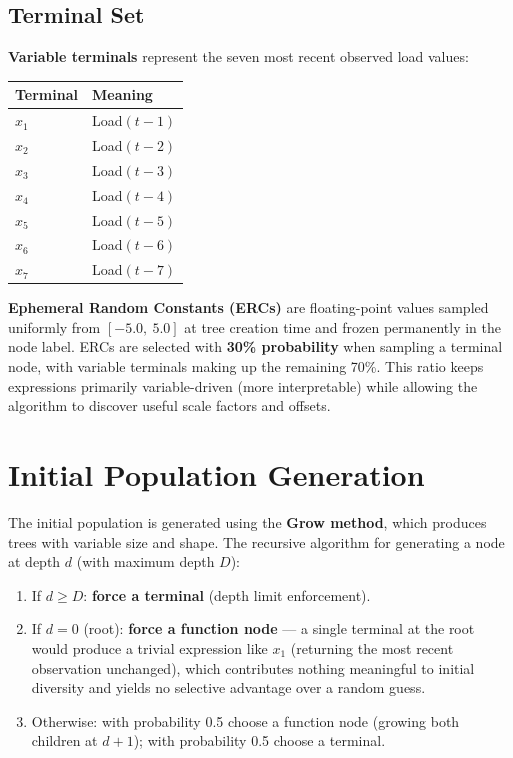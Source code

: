 \documentclass[12pt,a4paper]{article}
\begin{document}
\subsection{Terminal Set}

\textbf{Variable terminals} represent the seven most recent observed load values:

\begin{center}
\begin{tabular}{ll}
\toprule
\textbf{Terminal} & \textbf{Meaning} \\
\midrule
$x_1$ & Load$(t-1)$ \\
$x_2$ & Load$(t-2)$ \\
$x_3$ & Load$(t-3)$ \\
$x_4$ & Load$(t-4)$ \\
$x_5$ & Load$(t-5)$ \\
$x_6$ & Load$(t-6)$ \\
$x_7$ & Load$(t-7)$ \\
\bottomrule
\end{tabular}
\end{center}

\textbf{Ephemeral Random Constants (ERCs)} are floating-point values sampled uniformly from $[-5.0,\ 5.0]$ at tree creation time and frozen permanently in the node label. ERCs are selected with \textbf{30\% probability} when sampling a terminal node, with variable terminals making up the remaining 70\%. This ratio keeps expressions primarily variable-driven (more interpretable) while allowing the algorithm to discover useful scale factors and offsets.

\section{Initial Population Generation}

The initial population is generated using the \textbf{Grow method}, which produces trees with variable size and shape. The recursive algorithm for generating a node at depth $d$ (with maximum depth $D$):

\begin{enumerate}
    \item If $d \geq D$: \textbf{force a terminal} (depth limit enforcement).
    \item If $d = 0$ (root): \textbf{force a function node} --- a single terminal at the root would produce a trivial expression like $x_1$ (returning the most recent observation unchanged), which contributes nothing meaningful to initial diversity and yields no selective advantage over a random guess.
    \item Otherwise: with probability 0.5 choose a function node (growing both children at $d+1$); with probability 0.5 choose a terminal.
\end{enumerate}
\end{document}
